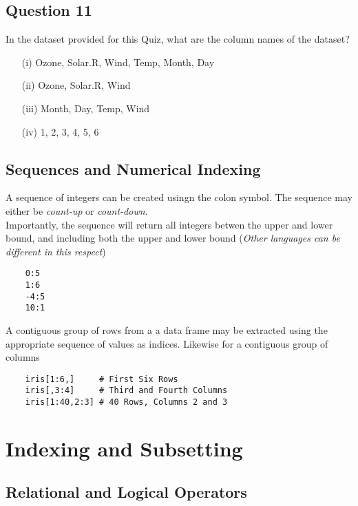 \documentclass[12pt]{article}
\begin{document}
\newpage
\subsection*{Question 11}
\Large
In the dataset provided for this Quiz, what are the column names of the dataset?
\begin{itemize} 
\item[(i)] Ozone, Solar.R, Wind, Temp, Month, Day
\item[(ii)] Ozone, Solar.R, Wind
\item[(iii)] Month, Day, Temp, Wind
\item[(iv)] 1, 2, 3, 4, 5, 6
\end{itemize}

\newpage
\subsection*{Sequences and Numerical Indexing}
\Large

A sequence of integers can be created usingn the colon symbol. The sequence may either be \textit{count-up} or \textit{count-down}.
\\
Importantly, the sequence will return all integers betwen the upper and lower bound, and including both the upper and lower bound (\textit{Other languages can be different in this respect})
\begin{framed}
	\begin{verbatim}
	0:5
	1:6
	-4:5
	10:1
	\end{verbatim}
\end{framed}

\noindent A contiguous group of rows from a a data frame may be extracted using the appropriate sequence of values as indices. Likewise for a contiguous group of columns

\begin{framed}
	\begin{verbatim}
	iris[1:6,]     # First Six Rows
	iris[,3:4]     # Third and Fourth Columns
	iris[1:40,2:3] # 40 Rows, Columns 2 and 3
	\end{verbatim}
\end{framed}

\section{Indexing and Subsetting }
\subsection{Relational and Logical Operators}
\end{document}
